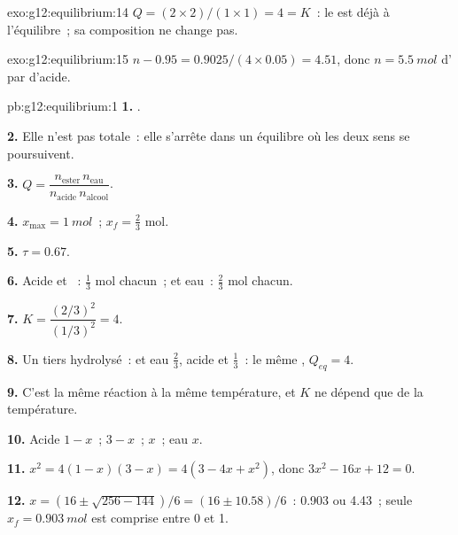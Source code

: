 \begin{solution}{exo:g12:equilibrium:14}
$Q = (2 \times 2)/(1 \times 1) = 4 = K$~: le  est déjà à
l'équilibre~; sa composition ne change pas.
\end{solution}

\begin{solution}{exo:g12:equilibrium:15}
$n - 0.95 = 0.9025 / (4 \times 0.05) = 4.51$, donc $n = \qty{5.5}{mol}$
d' par  d'acide.
\end{solution}

\begin{solution}{pb:g12:equilibrium:1}
\textbf{1.} .

\textbf{2.} Elle n'est pas totale~: elle s'arrête dans un équilibre où
les deux sens se poursuivent.

\textbf{3.} $Q = \dfrac{n_{\text{ester}}\, n_{\text{eau}}}{n_{\text{acide}}\, n_{\text{alcool}}}$.

\textbf{4.} $x_{\max} = \qty{1}{mol}$~; $x_f = \frac{2}{3}$ mol.

\textbf{5.} $\tau = 0.67$.

\textbf{6.} Acide et ~: $\frac{1}{3}$ mol chacun~;  et eau~:
$\frac{2}{3}$ mol chacun.

\textbf{7.} $K = \dfrac{(2/3)^2}{(1/3)^2} = 4$.

\textbf{8.} Un tiers hydrolysé~:  et eau $\frac{2}{3}$, acide et
 $\frac{1}{3}$~: le même , $Q_{eq} = 4$.

\textbf{9.} C'est la même réaction à la même température, et $K$ ne
dépend que de la température.

\textbf{10.} Acide $1 - x$~;  $3 - x$~;  $x$~; eau $x$.

\textbf{11.} $x^2 = 4(1 - x)(3 - x) = 4(3 - 4x + x^2)$, donc
$3x^2 - 16x + 12 = 0$.

\textbf{12.} $x = (16 \pm \sqrt{256 - 144})/6 = (16 \pm 10.58)/6$~:
0.903 ou 4.43~; seule $x_f = \qty{0.903}{mol}$ est comprise entre 0 et 1.


\end{solution}
